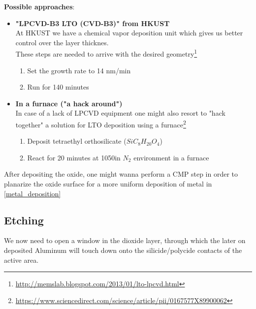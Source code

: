 \textbf{Possible approaches}:
\begin{itemize}
	\item \textbf{"LPCVD-B3 LTO (CVD-B3)" from HKUST} \\
	At HKUST we have a chemical vapor deposition unit which gives us better control over the layer thicknes. \\
	These steps are needed to arrive with the desired geometry\footnote{\url{http://memslab.blogspot.com/2013/01/lto-lpcvd.html}}
	\begin{enumerate}
		\item Set the growth rate to 14 nm/min
		\item Run for 140 minutes
	\end{enumerate}
	\item \textbf{In a furnace ("a hack around")} \\
	In case of a lack of LPCVD equipment one might also resort to "hack together" a solution for LTO deposition using a furnace\footnote{\url{https://www.sciencedirect.com/science/article/pii/0167577X89900062}}
		\begin{enumerate}
			\item Deposit tetraethyl orthosilicate ($Si C_8 H_{20} O_4$)
			\item React for 20 minutes at 1050\degreesC in $N_2$ environment in a furnace
	\end{enumerate}
\end{itemize}

After depositing the oxide, one might wanna perform a CMP step in order to planarize the oxide surface for a more uniform deposition of metal in \autoref{metal_deposition}

\newpage

\subsection{Etching}\label{contact_holes_etch}

We now need to open a window in the dioxide layer, through which the later on deposited Aluminum will touch down onto the silicide/polycide contacts of the active area.

